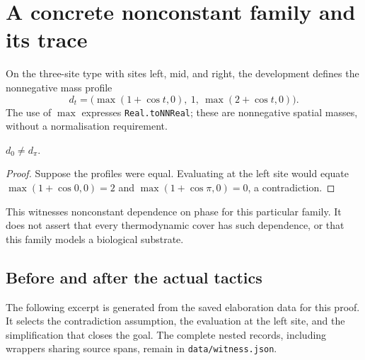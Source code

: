 \section{A concrete nonconstant family and its trace}
On the three-site type with sites left, mid, and right, the development defines
the nonnegative mass profile
\[
 d_t=\bigl(\max(1+\cos t,0),\ 1,\ \max(2+\cos t,0)\bigr).
\]
The use of $\max$ expresses \texttt{Real.toNNReal}; these are nonnegative
spatial masses, without a normalisation requirement.

\begin{claim}
$d_0\ne d_\pi$.
\end{claim}
\begin{proof}
Suppose the profiles were equal. Evaluating at the left site would equate
$\max(1+\cos0,0)=2$ and $\max(1+\cos\pi,0)=0$, a contradiction.
\end{proof}
\scope This witnesses nonconstant dependence on phase for this particular
family. It does not assert that every thermodynamic cover has such dependence,
or that this family models a biological substrate.

\subsection{Before and after the actual tactics}\label{sec:witness-trace}
The following excerpt is generated from the saved elaboration data for this
proof. It selects the contradiction assumption, the evaluation at the left
site, and the simplification that closes the goal. The complete nested records,
including wrappers sharing source spans, remain in \nolinkurl{data/witness.json}.
